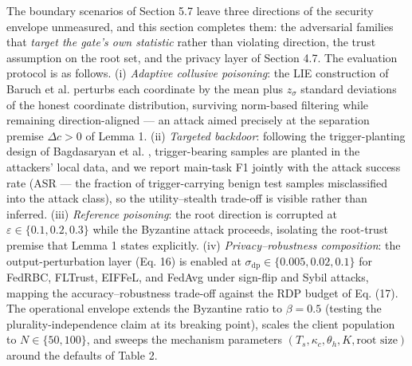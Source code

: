 \documentclass[cmc,article,submit,moreauthors,pdftex]{Definitions/tsp}
\begin{document}
The boundary scenarios of Section 5.7 leave three directions of the security envelope unmeasured, and this section completes them: the adversarial families that \emph{target the gate's own statistic} rather than violating direction, the trust assumption on the root set, and the privacy layer of Section 4.7. The evaluation protocol is as follows. (i) \emph{Adaptive collusive poisoning}: the LIE construction of Baruch et al. \cite{ref-14} perturbs each coordinate by the mean plus $z_\sigma$ standard deviations of the honest coordinate distribution, surviving norm-based filtering while remaining direction-aligned --- an attack aimed precisely at the separation premise $\Delta c > 0$ of Lemma 1. (ii) \emph{Targeted backdoor}: following the trigger-planting design of Bagdasaryan et al. \cite{ref-15}, trigger-bearing samples are planted in the attackers' local data, and we report main-task F1 jointly with the attack success rate (ASR --- the fraction of trigger-carrying benign test samples misclassified into the attack class), so the utility--stealth trade-off is visible rather than inferred. (iii) \emph{Reference poisoning}: the root direction is corrupted at $\varepsilon \in \{0.1, 0.2, 0.3\}$ while the Byzantine attack proceeds, isolating the root-trust premise that Lemma 1 states explicitly. (iv) \emph{Privacy--robustness composition}: the output-perturbation layer (Eq. 16) is enabled at $\sigma_{\mathrm{dp}} \in \{0.005, 0.02, 0.1\}$ for FedRBC, FLTrust, EIFFeL, and FedAvg under sign-flip and Sybil attacks, mapping the accuracy--robustness trade-off against the RDP budget of Eq. (17). The operational envelope extends the Byzantine ratio to $\beta = 0.5$ (testing the plurality-independence claim at its breaking point), scales the client population to $N \in \{50, 100\}$, and sweeps the mechanism parameters $(T_s, \kappa_c, \theta_h, K, \text{root size})$ around the defaults of Table 2.
\end{document}
